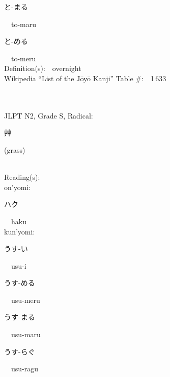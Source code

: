 \begin{multicols}{2}
{\hspace*{2em}}{\begin{CJK}{UTF8}{min} と-まる \end{CJK}}\ \ to-maru\ \ \\
{\hspace*{2em}}{\begin{CJK}{UTF8}{min} と-める \end{CJK}}\ \ to-meru\ \ \\
Definition(s):\ \ overnight \\
Wikipedia ``List of the J\=oy\=o Kanji'' Table \#:\ \ 1\,633 \\
\ \ \\
{\fontsize{34pt}{40pt}  }\ \ \\  %
{JLPT N2, Grade S, Radical:\ \ {\begin{CJK}{UTF8}{min} 艸 \end{CJK}} (grass) } \\
Reading(s):\ \ \\
{\hspace*{1em}}on'yomi:\ \ \\
{\hspace*{2em}}{\begin{CJK}{UTF8}{min} ハク \end{CJK}}\ \ haku\ \ \\
{\hspace*{1em}}kun'yomi:\ \ \\
{\hspace*{2em}}{\begin{CJK}{UTF8}{min} うす-い \end{CJK}}\ \ usu-i\ \ \\
{\hspace*{2em}}{\begin{CJK}{UTF8}{min} うす-める \end{CJK}}\ \ usu-meru\ \ \\
{\hspace*{2em}}{\begin{CJK}{UTF8}{min} うす-まる \end{CJK}}\ \ usu-maru\ \ \\
{\hspace*{2em}}{\begin{CJK}{UTF8}{min} うす-らぐ \end{CJK}}\ \ usu-ragu\ \ \\

\end{multicols}
